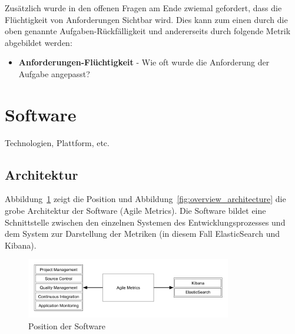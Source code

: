 Zusätzlich wurde in den offenen Fragen am Ende zwiemal gefordert, dass die Flüchtigkeit von Anforderungen Sichtbar wird. 
Dies kann zum einen durch die oben genannte Aufgaben-Rückfälligkeit und andererseits durch folgende Metrik abgebildet werden:

\begin{itemize}[noitemsep]
    \item \textbf{Anforderungen-Flüchtigkeit} \mbox{-} Wie oft wurde die Anforderung der Aufgabe angepasst?
\end{itemize}

\section{Software}

Technologien, Plattform, etc.

\subsection{Architektur}

Abbildung~\ref{fig:position_architecture} zeigt die Position und Abbildung~\ref{fig:overview_architecture} die grobe Architektur der Software (Agile Metrics).
Die Software bildet eine Schnittstelle zwischen den einzelnen Systemen des Entwicklungsprozesses und dem System zur Darstellung der Metriken (in diesem Fall ElasticSearch und Kibana).

\begin{savenotes}
    \begin{figure}[H] 
        \centering
            \includegraphics[width=0.8\textwidth]{img/position-overview.png}
        \caption{Position der Software}\label{fig:position_architecture}
    \end{figure}
\end{savenotes}

